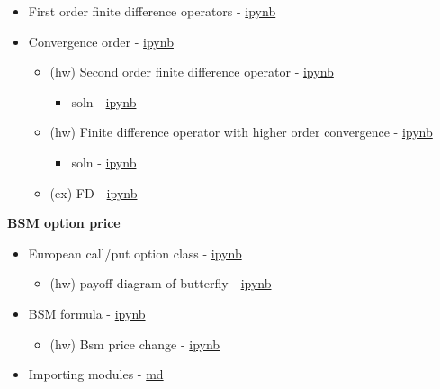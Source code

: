 \documentclass[11pt]{article}
\providecommand{\tightlist}{%
      \setlength{\itemsep}{0pt}\setlength{\parskip}{0pt}}
\begin{document}
\begin{itemize}
\tightlist
\item
  First order finite difference operators -
  \href{src/first_fd_v01.ipynb}{ipynb}
\item
  Convergence order - \href{src/ffd_convergence_rate_v01.ipynb}{ipynb}

  \begin{itemize}
  \tightlist
  \item
    (hw) Second order finite difference operator -
    \href{src/second_fd.ipynb}{ipynb}

    \begin{itemize}
    \tightlist
    \item
      soln - \href{src/second_fd_soln.ipynb}{ipynb}
    \end{itemize}
  \item
    (hw) Finite difference operator with higher order convergence -
    \href{src/ex_fd.ipynb}{ipynb}

    \begin{itemize}
    \tightlist
    \item
      soln - \href{src/ex_fd_soln.ipynb}{ipynb}
    \end{itemize}
  \item
    (ex) FD - \href{doc/fd_ex.pdf}{ipynb}
  \end{itemize}
\end{itemize}

\textbf{BSM option price}

\begin{itemize}
\tightlist
\item
  European call/put option class -
  \href{https://github.com/songqsh/18ma573pub/blob/master/src/european_options_class.ipynb}{ipynb}

  \begin{itemize}
  \tightlist
  \item
    (hw) payoff diagram of butterfly -
    \href{https://github.com/songqsh/18ma573pub/blob/master/src/option_combinations.ipynb}{ipynb}
  \end{itemize}
\item
  BSM formula -
  \href{https://github.com/songqsh/18ma573pub/blob/master/src/bsm_formula_v01.ipynb}{ipynb}

  \begin{itemize}
  \tightlist
  \item
    (hw) Bsm price change -
    \href{https://github.com/songqsh/18ma573pub/blob/master/src/bsm_price_change.ipynb}{ipynb}
  \end{itemize}
\item
  Importing modules -
  \href{https://github.com/songqsh/18ma573pub/blob/master/src/import_modules.md}{md}
\end{itemize}
\end{document}
